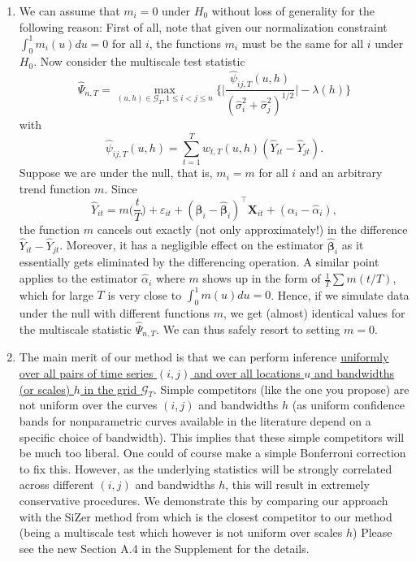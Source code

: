 \documentclass[a4paper,12pt]{article}
\begin{document}
\begin{enumerate}[label=\arabic*.,leftmargin=0.6cm]
\begin{enumerate}[label=(\roman*),leftmargin=0.75cm,topsep=0pt]
\item We can assume that $m_i=0$ under $H_0$ without loss of generality for the following reason: First of all, note that given our normalization constraint $\int_0^1 m_i(u)du = 0$ for all $i$, the functions $m_i$ must be the same for all $i$ under $H_0$. Now consider the multiscale test statistic 
\[ \widehat{\Psi}_{n,T} = \max_{(u,h) \in \mathcal{G}_T, 1 \le i < j \le n} \Big\{ \Big| \frac{\widehat{\psi}_{ij,T}(u,h)}{(\widehat{\sigma}_i^2 + \widehat{\sigma}_j^2)^{1/2}} \Big| - \lambda(h) \Big\} \]
with
\[ \widehat{\psi}_{ij,T}(u,h) = \sum_{t=1}^T w_{t,T}(u,h) (\widehat{Y}_{it} - \widehat{Y}_{jt}). \]
Suppose we are under the null, that is, $m_i = m$ for all $i$ and an arbitrary trend function $m$. Since
\[ \widehat{Y}_{it} = m\Big(\frac{t}{T}\Big) + \varepsilon_{it} + (\boldsymbol{\beta}_i - \widehat{\boldsymbol{\beta}}_i)^\top \boldsymbol{X}_{it} + (\alpha_i - \widehat{\alpha}_i), \]
the function $m$ cancels out exactly (not only approximately!) in the difference $\widehat{Y}_{it} - \widehat{Y}_{jt}$. Moreover, it has a negligible effect on the estimator $\widehat{\boldsymbol{\beta}}_i$ as it essentially gets eliminated by the differencing operation. A similar point applies to the estimator $\widehat{\alpha}_i$ where $m$ shows up in the form of $\frac{1}{T} \sum m(t/T)$, which for large $T$ is very close to $\int_0^1 m(u) du = 0$. Hence, if we simulate data under the null with different functions $m$, we get (almost) identical values for the multiscale statistic $\widehat{\Psi}_{n,T}$. We can thus safely resort to setting $m=0$. 

\item %
The main merit of our method is that we can perform inference \uline{uniformly over all pairs of time series $(i,j)$ and over all locations $u$ and bandwidths (or scales) $h$ in the grid $\mathcal{G}_T$}. Simple competitors (like the one you propose) are not uniform over the curves $(i,j)$ and bandwidths $h$ (as uniform confidence bands for nonparametric curves available in the literature depend on a specific choice of bandwidth). This implies that these simple competitors will be much too liberal. One could of course make a simple Bonferroni correction to fix this. However, as the underlying statistics will be strongly correlated across different $(i,j)$ and bandwidths $h$, this will result in extremely conservative procedures. We demonstrate this by comparing our approach with the SiZer method from \cite{Park2009} which is the closest competitor to our method (being a multiscale test which however is not uniform over scales $h$) Please see the new Section A.4 in the Supplement for the details. 


\end{enumerate}
\end{enumerate}
\end{document}
